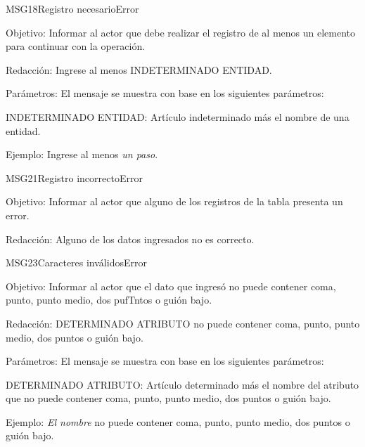 \begin{mensaje}{MSG18}{Registro necesario}{Error}
    \item[Objetivo:] Informar al actor que debe realizar el registro de al menos un elemento para continuar con la operación.
    \item[Redacción:] Ingrese al menos INDETERMINADO ENTIDAD.
    \item[Parámetros:] El mensaje se muestra con base en los siguientes parámetros:
    \begin{Citemize}
	\item INDETERMINADO ENTIDAD: Artículo indeterminado más el nombre de una entidad.
    \end{Citemize}
    \item[Ejemplo:] Ingrese al menos {\em un paso}.
\end{mensaje}
\begin{mensaje}{MSG21}{Registro incorrecto}{Error}
    \item[Objetivo:] Informar al actor que alguno de los registros de la tabla presenta un error.
    \item[Redacción:] Alguno de los datos ingresados no es correcto.
\end{mensaje}
\begin{mensaje}{MSG23}{Caracteres inválidos}{Error}
    \item[Objetivo:] Informar al actor que el dato que ingresó no puede contener coma, punto, punto medio, dos pufTntos o guión bajo.
    \item[Redacción:] DETERMINADO ATRIBUTO no puede contener coma, punto, punto medio, dos puntos o guión bajo.
    \item[Parámetros:] El mensaje se muestra con base en los siguientes parámetros:
    \begin{Citemize}
	\item DETERMINADO ATRIBUTO: Artículo determinado más el nombre del atributo que no puede contener coma, punto, punto medio, dos puntos o guión bajo.
    \end{Citemize}
    \item[Ejemplo:] { \em El nombre} no puede contener coma, punto, punto medio, dos puntos o guión bajo.
\end{mensaje}
